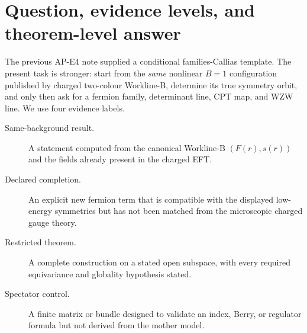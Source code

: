 \documentclass[11pt]{article}
\theoremstyle{definition}
\theoremstyle{remark}
\newcommand{\ZZ}{\mathbb Z}
\newcommand{\CP}{\mathbb {CP}}
\newcommand{\cC}{\mathcal C}
\begin{document}
\begin{abstract}
Finally, define first the universal differential character
\[
 \widehat\Xi_5
 =2\,\operatorname{pr}_U^*\widehat\omega_3
 \smile\operatorname{pr}_s^*\widehat c_1(\mathsf H)
 \in\widehat H^5(SU(2)\times\CP^1;\ZZ),
\]
then pull it back by the evaluation map on
\(\Sigma_3\times\cC_{\rm restr}\) and fiber-integrate to a degree-two
character.  This is a well-typed local ansatz.  Constant-loop and centre
phase controls do not prove descent on the restricted gauge stack: all
components of \(\operatorname{Map}(\Sigma_3,U(1))\), an equivariant cocycle,
and vertical holonomy remain untreated.  The odd/even centre test is only a
necessary control, not an exactly-two theorem.  Consequently every descent,
same-soliton composition, and portal gate remains false.
\end{abstract}

\tableofcontents

\section{Question, evidence levels, and theorem-level answer}

The previous AP-E4 note supplied a conditional families-Callias template.
The present task is stronger: start from the \emph{same} nonlinear \(B=1\)
configuration published by charged two-colour Workline-B, determine its true
symmetry orbit, and only then ask for a fermion family, determinant line, CPT
map, and WZW line.  We use four evidence labels.

\begin{description}
\item[Same-background result.] A statement computed from the canonical
  Workline-B \((F(r),s(r))\) and the fields already present in the charged EFT.
\item[Declared completion.] An explicit new fermion term that is compatible
  with the displayed low-energy symmetries but has not been matched from the
  microscopic charged gauge theory.
\item[Restricted theorem.] A complete construction on a stated open
  subspace, with every required equivariance and globality hypothesis stated.
\item[Spectator control.] A finite matrix or bundle designed to validate an
  index, Berry, or regulator formula but not derived from the mother model.
\end{description}
\end{document}
